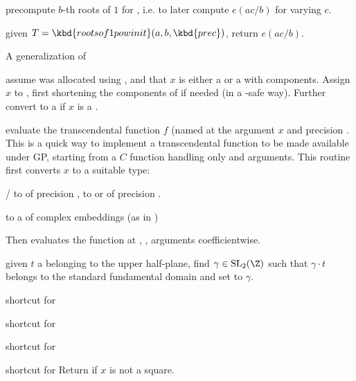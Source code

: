 precompute $b$-th
roots of $1$ for , i.e. to later compute $e(ac/b)$ for
varying $c$.

 given
$T = \kbd{rootsof1powinit}(a,b,\kbd{prec})$, return $e(ac/b)$.


\noindent A generalization of 

 assume  was allocated using
, and that $x$ is either a  or a 
with  components. Assign $x$ to , first shortening
the components of  if needed (in a -safe way). Further
convert  to a  if $x$ is a .

evaluate the transcendental function $f$ (named  at the argument
$x$ and precision . This is a quick way to implement a transcendental
function to be made available under GP, starting from a $C$ function
handling only  and  arguments. This routine first
converts $x$ to a suitable type:

\item {}/ to  of precision ,  to
 or  of precision .

\item {} to a  of complex embeddings (as in )

Then evaluates the function at , ,  arguments
coefficientwise.


 given $t$ a  belonging to the
upper half-plane, find $\gamma \in \text{SL}_2(\Z)$ such that $\gamma \cdot t$
belongs to the standard fundamental domain and set  to $\gamma$.


 shortcut for 

 shortcut for 

 shortcut for 

 shortcut for 
Return  if $x$ is not a square.

